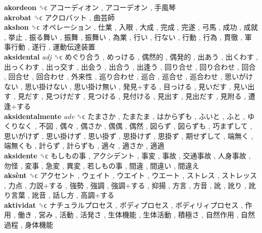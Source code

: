 \textbf{akordeon} ␝ϲ   アコーディオン ,  アコーデオン ,  手風琴   \\
\textbf{akrobat} ␝ϲ   アクロバット ,  曲芸師   \\
\textbf{akshon} ␝ϲ   オペレーション ,  仕業 ,  入眼 ,  大成 ,  完成 ,  完遂 ,  弓馬 ,  成功 ,  成就 ,  挙止 ,  振る舞い ,  振舞 ,  振舞い ,  為業 ,  行い ,  行ない ,  行動 ,  行為 ,  貫徹 ,  軍事行動 ,  遂行 ,  運動伝達装置   \\
\textbf{aksidental} \emph{adj}  ␝ϲ   めぐり合う ,  めっける ,  偶然的 ,  偶発的 ,  出あう ,  出くわす ,  出っくわす ,  出っ交す ,  出会う ,  出合う ,  出逢う ,  回り合せ ,  回り合わせ ,  回合 ,  回合せ ,  回合わせ ,  外来性 ,  巡り合わせ ,  巡合 ,  巡合せ ,  巡合わせ ,  思いがけない ,  思い掛けない ,  思い掛け無い ,  発見+する ,  目っける ,  見いだす ,  見い出す ,  見だす ,  見つけだす ,  見つける ,  見付ける ,  見出す ,  見出だす ,  見附る ,  遭逢+する   \\
\textbf{aksidentalmente} \emph{adv}  ␝ϲ   たまさか ,  たまたま ,  はからずも ,  ふいと ,  ふと ,  ゆくりなく ,  不図 ,  偶々 ,  偶さか ,  偶偶 ,  偶然 ,  図らず ,  図らずも ,  巧まずして ,  思いがけず ,  思い掛けず ,  思い掛ず ,  思掛けず ,  思掛ず ,  期せずして ,  端無く ,  端無くも ,  計らず ,  計らずも ,  適々 ,  適さか ,  適適   \\
\textbf{aksidente} ␝ϲ   もしもの事 ,  アクシデント ,  事変 ,  事故 ,  交通事故 ,  人身事故 ,  勿怪 ,  変事 ,  急変 ,  異変 ,  若しもの事 ,  間違 ,  間違い ,  間違え   \\
\textbf{aksènt} ␝ϲ   アクセント ,  ウェイト ,  ウエイト ,  ウエート ,  ストレス ,  ストレッス ,  力点 ,  力説+する ,  強勢 ,  強調 ,  強調+する ,  抑揚 ,  方言 ,  方音 ,  訛 ,  訛り ,  訛り言葉 ,  訛音 ,  話し方 ,  高調+する   \\
\textbf{aktividat} ␝ϲ   ナチュラルプロセス ,  ボディプロセス ,  ボディリィプロセス ,  作用 ,  働き ,  営み ,  活動 ,  活発さ ,  生体機能 ,  生体活動 ,  積極さ ,  自然作用 ,  自然過程 ,  身体機能   \\
